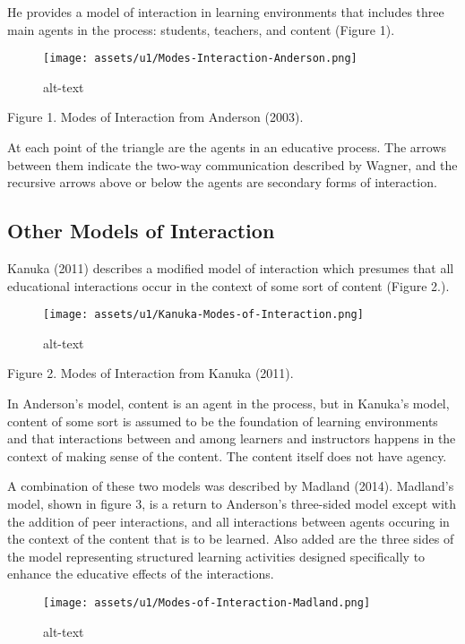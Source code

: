 \documentclass[
]{book}
\begin{document}
He provides a model of interaction in learning environments that includes three main agents in the process: students, teachers, and content (Figure 1).

\begin{figure}
\centering
\texttt{[image: assets/u1/Modes-Interaction-Anderson.png]}
\caption{alt-text}
\end{figure}

Figure 1. Modes of Interaction from Anderson (2003).

At each point of the triangle are the agents in an educative process. The arrows between them indicate the two-way communication described by Wagner, and the recursive arrows above or below the agents are secondary forms of interaction.

\hypertarget{other-models-of-interaction}{%
\subsection*{Other Models of Interaction}\label{other-models-of-interaction}}

Kanuka (2011) describes a modified model of interaction which presumes that all educational interactions occur in the context of some sort of content (Figure 2.).

\begin{figure}
\centering
\texttt{[image: assets/u1/Kanuka-Modes-of-Interaction.png]}
\caption{alt-text}
\end{figure}

Figure 2. Modes of Interaction from Kanuka (2011).

In Anderson's model, content is an agent in the process, but in Kanuka's model, content of some sort is assumed to be the foundation of learning environments and that interactions between and among learners and instructors happens in the context of making sense of the content. The content itself does not have agency.

A combination of these two models was described by Madland (2014). Madland's model, shown in figure 3, is a return to Anderson's three-sided model except with the addition of peer interactions, and all interactions between agents occuring in the context of the content that is to be learned. Also added are the three sides of the model representing structured learning activities designed specifically to enhance the educative effects of the interactions.

\begin{figure}
\centering
\texttt{[image: assets/u1/Modes-of-Interaction-Madland.png]}
\caption{alt-text}
\end{figure}
\end{document}

